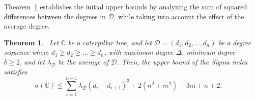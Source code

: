 \documentclass[12pt, a4paper]{article}
\theoremstyle{plain}  %
\newtheorem{theorem}{Theorem}[section]
\theoremstyle{definition}  %
\newcommand{\CC}{\mathbb{C}}
\begin{document}
Theorem~\ref{TnpowPronu4} establishes the initial upper bounds by analyzing the sum of squared differences between the degrees in $\mathscr{D}$, while taking into account the effect of the average degree.


\begin{theorem}~\label{TnpowPronu4}
Let $\CC$ be a caterpillar tree, and let $\mathscr{D} = (d_1, d_2, \dots, d_n)$ be a degree sequence where $d_1 \geqslant d_2 \geqslant \dots \geqslant d_n$, with maximum degree $\Delta$, minimum degree $\delta \geqslant 2$, and let $\lambda_{\mathscr{D}}$ be the average of $\mathscr{D}$. Then, the upper bound of the Sigma index satisfies
\begin{equation}~\label{eq1TnpowPronu4}
\sigma(\CC)\leqslant \sum_{i=1}^{n-1}\lambda_{\mathscr{D}}(d_i-d_{i+1})^3 +2(n^2+m^2)+3m+n+2.
\end{equation}
\end{theorem}
\end{document}
